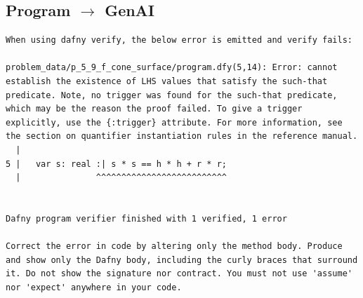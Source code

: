 \documentclass{article}
\begin{document}
\subsection*{Program $\rightarrow$ GenAI}
\begin{lstlisting}
When using dafny verify, the below error is emitted and verify fails:

problem_data/p_5_9_f_cone_surface/program.dfy(5,14): Error: cannot establish the existence of LHS values that satisfy the such-that predicate. Note, no trigger was found for the such-that predicate, which may be the reason the proof failed. To give a trigger explicitly, use the {:trigger} attribute. For more information, see the section on quantifier instantiation rules in the reference manual.
  |
5 |   var s: real :| s * s == h * h + r * r;
  |               ^^^^^^^^^^^^^^^^^^^^^^^^^^


Dafny program verifier finished with 1 verified, 1 error

Correct the error in code by altering only the method body. Produce and show only the Dafny body, including the curly braces that surround it. Do not show the signature nor contract. You must not use 'assume' nor 'expect' anywhere in your code.
\end{lstlisting}
\end{document}
